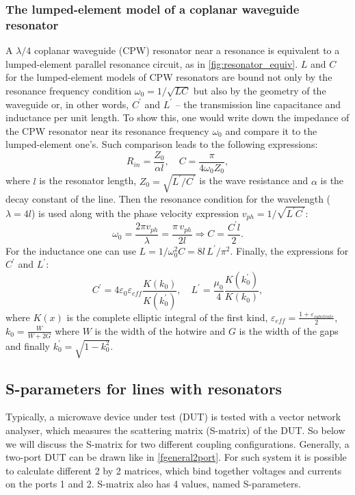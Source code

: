 \documentclass[12pt, twoside]{report}
\numberwithin{equation}{section}
\begin{document}
\subsubsection{The lumped-element model of a coplanar waveguide resonator}\label{ssec:LE-model}
A $\lambda/4$ coplanar waveguide (CPW) resonator near a resonance is equivalent to a lumped-element parallel resonance circuit, as in \autoref{fig:resonator_equiv}. $L$ and $C$ for the lumped-element models of CPW resonators are bound not only by the resonance frequency condition $\omega_0 = 1/\sqrt{LC}$ but also by the geometry of the waveguide or, in other words, $C^\prime$ and $L^\prime$ -- the transmission line capacitance and inductance per unit length. To show this, one would write down the impedance of the CPW resonator near its resonance frequency $\omega_0$ and compare it to the lumped-element one's\cite{pozar2012}. Such comparison leads to the following expressions:
\[
R_{in} = \frac{Z_0}{\alpha l}, \quad C = \frac{\pi}{4\omega_0 Z_0},
\]
where $l$ is the resonator length, $Z_0 = \sqrt{L^\prime/C^\prime}$ is the wave resistance and $\alpha$ is the decay constant of the line. Then the resonance condition for the wavelength ($\lambda = 4 l$) is used along with the phase velocity expression $v_{ph} = 1/\sqrt{L^\prime C^\prime}$:
\[
\omega_0 = \frac{2\pi v_{ph}}{\lambda} =  \frac{\pi \, v_{ph}}{2 l} \Rightarrow  C = \frac{C^\prime l}{2}.
\]
For the inductance one can use $L = 1/\omega_0^2 C = 8 l\, L^\prime/\pi^2$. Finally, the expressions for $C^\prime$ and $L^\prime$:
\[
C^\prime = 4\varepsilon_0\varepsilon_{eff} \frac{K(k_0)}{K(k_0^\prime)},\quad
L^\prime = \frac{\mu_0}{4} \frac{K(k_0^\prime)}{K(k_0)},
\]
where $K(x)$ is the complete elliptic integral of the first kind, $\varepsilon_{eff} = \frac{1+\varepsilon_{substrate}}{2}$, $k_0 = \frac{W}{W+2G}$ where $W$ is the width of the hotwire and $G$ is the width of the gaps and finally $k_0^\prime = \sqrt{1-k_0^2}$.

\subsection{S-parameters for lines with resonators}

Typically, a microwave device under test (DUT) is tested with a vector network analyser, which measures the scattering matrix (S-matrix) of the DUT. So below we will discuss the S-matrix for two different coupling configurations. Generally, a two-port DUT can be drawn like in \autoref{fgeneral2port}. For such system it is possible to calculate different 2 by 2 matrices, which bind together voltages and currents on the ports 1 and 2. S-matrix also has 4 values, named S-parameters.
\end{document}
